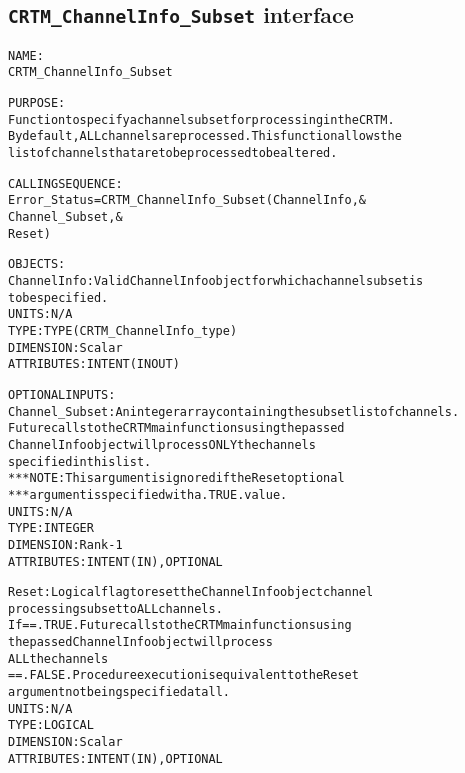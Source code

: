 \subsection{\texttt{CRTM\_ChannelInfo\_Subset} interface}
  \label{sec:CRTM_ChannelInfo_Subset_interface}
  \begin{alltt}
 
  NAME:
        CRTM_ChannelInfo_Subset
 
  PURPOSE:
        Function to specify a channel subset for processing in the CRTM.
        By default, ALL channels are processed. This function allows the
        list of channels that are to be processed to be altered.
 
  CALLING SEQUENCE:
        Error_Status = CRTM_ChannelInfo_Subset( ChannelInfo   , &
                                                Channel_Subset, &
                                                Reset           )
 
  OBJECTS:
        ChannelInfo:    Valid ChannelInfo object for which a channel subset is
                        to be specified.
                        UNITS:      N/A
                        TYPE:       TYPE(CRTM_ChannelInfo_type)
                        DIMENSION:  Scalar
                        ATTRIBUTES: INTENT(IN OUT)
 
  OPTIONAL INPUTS:
        Channel_Subset: An integer array containing the subset list of channels.
                        Future calls to the CRTM main functions using the passed
                        ChannelInfo object will process ONLY the channels
                        specified in this list.
                        *** NOTE: This argument is ignored if the Reset optional
                        *** argument is specified with a .TRUE. value.            
                        UNITS:      N/A
                        TYPE:       INTEGER
                        DIMENSION:  Rank-1
                        ATTRIBUTES: INTENT(IN), OPTIONAL
 
        Reset:          Logical flag to reset the ChannelInfo object channel
                        processing subset to ALL channels.
                        If == .TRUE.  Future calls to the CRTM main functions using
                                      the passed ChannelInfo object will process
                                      ALL the channels
                           == .FALSE. Procedure execution is equivalent to the Reset
                                      argument not being specified at all.
                        UNITS:      N/A
                        TYPE:       LOGICAL
                        DIMENSION:  Scalar
                        ATTRIBUTES: INTENT(IN), OPTIONAL
 

\end{alltt}
